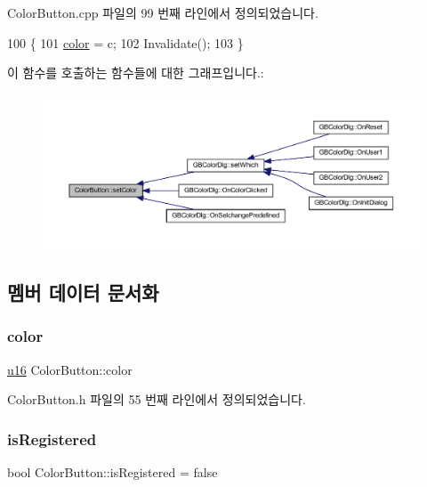 Color\+Button.\+cpp 파일의 99 번째 라인에서 정의되었습니다.


\begin{DoxyCode}
100 \{
101   \mbox{\hyperlink{class_color_button_ac2e59577aba7413fbf40c97f21df4835}{color}} = c;
102   Invalidate();
103 \}
\end{DoxyCode}
이 함수를 호출하는 함수들에 대한 그래프입니다.\+:
\nopagebreak
\begin{figure}[H]
\begin{center}
\leavevmode
\includegraphics[width=350pt]{class_color_button_a9ff5dc144a4acd5e2551ab94506b3bb0_icgraph}
\end{center}
\end{figure}


\subsection{멤버 데이터 문서화}
\mbox{\label{class_color_button_ac2e59577aba7413fbf40c97f21df4835}} 
\subsubsection{\texorpdfstring{color}{color}}
{\footnotesize\ttfamily \mbox{\hyperlink{_system_8h_a9e6c91d77e24643b888dbd1a1a590054}{u16}} Color\+Button\+::color}



Color\+Button.\+h 파일의 55 번째 라인에서 정의되었습니다.

\mbox{\label{class_color_button_a77e2fa25affb19cac1c18594d5bc478f}} 
\subsubsection{\texorpdfstring{is\+Registered}{isRegistered}}
{\footnotesize\ttfamily bool Color\+Button\+::is\+Registered = false\hspace{0.3cm}{\ttfamily [static]}}



